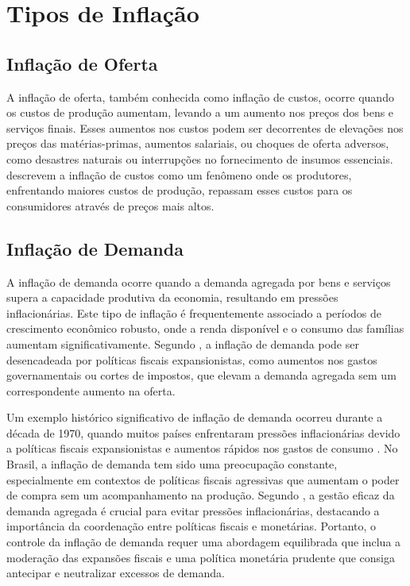 \documentclass[12pt,oneside,a4paper,chapter=TITLE,english,brazil,sumario=abnt-6027-2012]{abntex2}
\begin{document}
\chapter{Tipos de Inflação}

\section{Inflação de Oferta}

A inflação de oferta, também conhecida como inflação de custos, ocorre quando os custos de produção aumentam, levando a um aumento nos preços dos bens e serviços finais. Esses aumentos nos custos podem ser decorrentes de elevações nos preços das matérias-primas, aumentos salariais, ou choques de oferta adversos, como desastres naturais ou interrupções no fornecimento de insumos essenciais.  descrevem a inflação de custos como um fenômeno onde os produtores, enfrentando maiores custos de produção, repassam esses custos para os consumidores através de preços mais altos.



\section{Inflação de Demanda}

A inflação de demanda ocorre quando a demanda agregada por bens e serviços supera a capacidade produtiva da economia, resultando em pressões inflacionárias. Este tipo de inflação é frequentemente associado a períodos de crescimento econômico robusto, onde a renda disponível e o consumo das famílias aumentam significativamente. Segundo , a inflação de demanda pode ser desencadeada por políticas fiscais expansionistas, como aumentos nos gastos governamentais ou cortes de impostos, que elevam a demanda agregada sem um correspondente aumento na oferta.

Um exemplo histórico significativo de inflação de demanda ocorreu durante a década de 1970, quando muitos países enfrentaram pressões inflacionárias devido a políticas fiscais expansionistas e aumentos rápidos nos gastos de consumo \cite{blinder_2008_the}. No Brasil, a inflação de demanda tem sido uma preocupação constante, especialmente em contextos de políticas fiscais agressivas que aumentam o poder de compra sem um acompanhamento na produção. Segundo \cite{woodford_2009_interest}, a gestão eficaz da demanda agregada é crucial para evitar pressões inflacionárias, destacando a importância da coordenação entre políticas fiscais e monetárias. Portanto, o controle da inflação de demanda requer uma abordagem equilibrada que inclua a moderação das expansões fiscais e uma política monetária prudente que consiga antecipar e neutralizar excessos de demanda.
\end{document}
